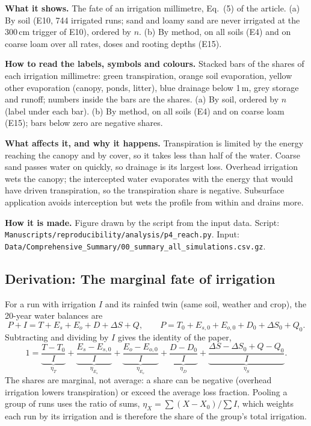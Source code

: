 \textbf{What it shows.} The fate of an irrigation millimetre, Eq.~(5) of the article. (a) By soil (E10, 744 irrigated runs; sand and loamy sand are never irrigated at the 300\,cm trigger of E10), ordered by $n$. (b) By method, on all soils (E4) and on coarse loam over all rates, doses and rooting depths (E15).

\textbf{How to read the labels, symbols and colours.} Stacked bars of the shares of each irrigation millimetre: green transpiration, orange soil evaporation, yellow other evaporation (canopy, ponds, litter), blue drainage below 1\,m, grey storage and runoff; numbers inside the bars are the shares. (a) By soil, ordered by $n$ (label under each bar). (b) By method, on all soils (E4) and on coarse loam (E15); bars below zero are negative shares.

\textbf{What affects it, and why it happens.} Transpiration is limited by the energy reaching the canopy and by cover, so it takes less than half of the water. Coarse sand passes water on quickly, so drainage is its largest loss. Overhead irrigation wets the canopy; the intercepted water evaporates with the energy that would have driven transpiration, so the transpiration share is negative. Subsurface application avoids interception but wets the profile from within and drains more.

\textbf{How it is made.} Figure drawn by the script from the input data. Script: \nolinkurl{Manuscripts/reproducibility/analysis/p4_reach.py}. Input: \nolinkurl{Data/Comprehensive_Summary/00_summary_all_simulations.csv.gz}.


\subsection{Derivation: The marginal fate of irrigation}\label{der:s4:6}
For a run with irrigation $I$ and its rainfed twin (same soil, weather and crop), the 20-year water balances are
\begin{equation}
P+I=T+E_s+E_o+D+\Delta S+Q,\qquad P=T_0+E_{s,0}+E_{o,0}+D_0+\Delta S_0+Q_0 .
\end{equation}
Subtracting and dividing by $I$ gives the identity of the paper,
\begin{equation}
1=\underbrace{\frac{T-T_0}{I}}_{\eta_T}+\underbrace{\frac{E_s-E_{s,0}}{I}}_{\eta_{E_s}}+\underbrace{\frac{E_o-E_{o,0}}{I}}_{\eta_{E_o}}+\underbrace{\frac{D-D_0}{I}}_{\eta_D}+\underbrace{\frac{\Delta S-\Delta S_0+Q-Q_0}{I}}_{\eta_S}.
\end{equation}
The shares are marginal, not average: a share can be negative (overhead irrigation lowers transpiration) or exceed the average loss fraction. Pooling a group of runs uses the ratio of sums, $\eta_X=\sum(X-X_0)/\sum I$, which weights each run by its irrigation and is therefore the share of the group's total irrigation.


